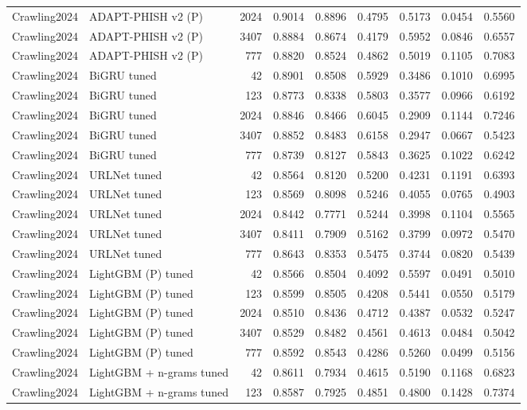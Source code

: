 \begin{table}[t]
\begin{tabular}{llrrrrrrr}
Crawling2024 & ADAPT-PHISH v2 (P) & 2024 & 0.9014 & 0.8896 & 0.4795 & 0.5173 & 0.0454 & 0.5560 \\
Crawling2024 & ADAPT-PHISH v2 (P) & 3407 & 0.8884 & 0.8674 & 0.4179 & 0.5952 & 0.0846 & 0.6557 \\
Crawling2024 & ADAPT-PHISH v2 (P) & 777 & 0.8820 & 0.8524 & 0.4862 & 0.5019 & 0.1105 & 0.7083 \\
Crawling2024 & BiGRU tuned & 42 & 0.8901 & 0.8508 & 0.5929 & 0.3486 & 0.1010 & 0.6995 \\
Crawling2024 & BiGRU tuned & 123 & 0.8773 & 0.8338 & 0.5803 & 0.3577 & 0.0966 & 0.6192 \\
Crawling2024 & BiGRU tuned & 2024 & 0.8846 & 0.8466 & 0.6045 & 0.2909 & 0.1144 & 0.7246 \\
Crawling2024 & BiGRU tuned & 3407 & 0.8852 & 0.8483 & 0.6158 & 0.2947 & 0.0667 & 0.5423 \\
Crawling2024 & BiGRU tuned & 777 & 0.8739 & 0.8127 & 0.5843 & 0.3625 & 0.1022 & 0.6242 \\
Crawling2024 & URLNet tuned & 42 & 0.8564 & 0.8120 & 0.5200 & 0.4231 & 0.1191 & 0.6393 \\
Crawling2024 & URLNet tuned & 123 & 0.8569 & 0.8098 & 0.5246 & 0.4055 & 0.0765 & 0.4903 \\
Crawling2024 & URLNet tuned & 2024 & 0.8442 & 0.7771 & 0.5244 & 0.3998 & 0.1104 & 0.5565 \\
Crawling2024 & URLNet tuned & 3407 & 0.8411 & 0.7909 & 0.5162 & 0.3799 & 0.0972 & 0.5470 \\
Crawling2024 & URLNet tuned & 777 & 0.8643 & 0.8353 & 0.5475 & 0.3744 & 0.0820 & 0.5439 \\
Crawling2024 & LightGBM (P) tuned & 42 & 0.8566 & 0.8504 & 0.4092 & 0.5597 & 0.0491 & 0.5010 \\
Crawling2024 & LightGBM (P) tuned & 123 & 0.8599 & 0.8505 & 0.4208 & 0.5441 & 0.0550 & 0.5179 \\
Crawling2024 & LightGBM (P) tuned & 2024 & 0.8510 & 0.8436 & 0.4712 & 0.4387 & 0.0532 & 0.5247 \\
Crawling2024 & LightGBM (P) tuned & 3407 & 0.8529 & 0.8482 & 0.4561 & 0.4613 & 0.0484 & 0.5042 \\
Crawling2024 & LightGBM (P) tuned & 777 & 0.8592 & 0.8543 & 0.4286 & 0.5260 & 0.0499 & 0.5156 \\
Crawling2024 & LightGBM + n-grams tuned & 42 & 0.8611 & 0.7934 & 0.4615 & 0.5190 & 0.1168 & 0.6823 \\
Crawling2024 & LightGBM + n-grams tuned & 123 & 0.8587 & 0.7925 & 0.4851 & 0.4800 & 0.1428 & 0.7374 \\

\end{tabular}
\end{table}
